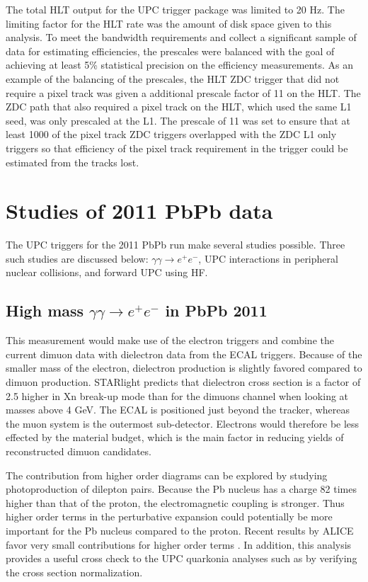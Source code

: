    The total HLT output for the UPC trigger package was limited to 20 Hz. 
    The limiting factor for the HLT rate was the amount of disk space given 
      to this analysis. 
    To meet the bandwidth requirements and collect a significant sample
      of data for estimating efficiencies, the prescales were balanced with 
      the goal of achieving at least 5\% statistical precision on the 
      efficiency measurements. 
    As an example of the balancing of the prescales, the HLT  ZDC trigger that 
      did not require a pixel track was given a additional prescale factor 
      of 11 on the HLT.
    The ZDC path that also required a pixel track on the HLT, which used 
      the same L1 seed, was only prescaled at the L1.
    The prescale of 11 was set to ensure that at least 1000 of the pixel track 
      ZDC triggers overlapped with the ZDC L1 only triggers so that efficiency
      of the pixel track requirement in the trigger could be estimated from 
      the tracks lost.

  \section{Studies of 2011 PbPb data}
    The UPC triggers for the 2011 PbPb run make several studies possible.
    Three such studies are discussed below: $\gamma\gamma \rightarrow e^{+} 
      e^{-}$, UPC interactions in peripheral nuclear collisions, and forward
      UPC \JPsi{} using HF. 

    \subsection{High mass $\gamma\gamma \rightarrow e^{+} e^{-}$  in PbPb 2011}
      This measurement would make use of the electron triggers and combine the 
        current dimuon data with dielectron data from the ECAL triggers.
      Because of the smaller mass of the electron,
        dielectron production is slightly favored compared to dimuon 
        production.
      STARlight predicts that dielectron cross section is a factor of 
        2.5 higher in Xn break-up mode than for the dimuons channel when looking 
        at masses above 4 GeV.
      The ECAL is positioned just beyond the tracker, whereas the muon system is 
        the outermost sub-detector.
      Electrons would therefore be less effected by the material budget, which
        is the main factor in reducing yields of reconstructed dimuon 
        candidates.

      The contribution from higher order diagrams can be explored by studying 
        photoproduction of dilepton pairs.
      Because the Pb nucleus has a charge 82 times higher than that of the 
        proton, the electromagnetic coupling is stronger. 
      Thus higher order terms in the perturbative expansion could potentially 
        be more important for the Pb nucleus compared to the proton.
      Recent results by ALICE favor very small contributions for higher order
        terms \cite{Abbas:2013oua}.
      In addition, this analysis provides a useful cross check to the UPC 
        quarkonia analyses such as \JPsi{} by verifying the cross section 
        normalization.


